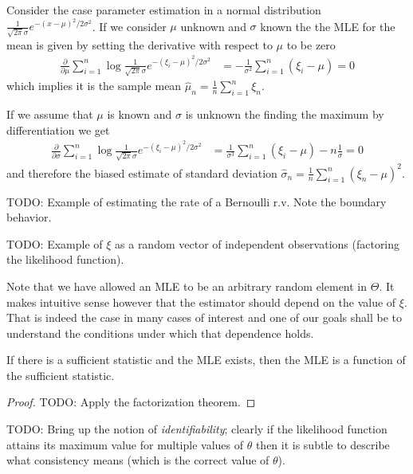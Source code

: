 \begin{examp}\label{MLENormalParameters}Consider the case parameter estimation in a normal
  distribution $\frac{1}{\sqrt{2\pi}\sigma} e^{-(x - \mu)^2 /
    2\sigma^2}$.  If we consider $\mu$ unknown and $\sigma$ known the
    the MLE for the mean is given by setting the derivative with
    respect to $\mu$ to be zero
\begin{align*}
\frac{\partial}{\partial \mu} \sum_{i=1}^n \log \frac{1}{\sqrt{2\pi}\sigma} e^{-(\xi_i - \mu)^2 /
    2\sigma^2} &= - \frac{1}{\sigma^2} \sum_{i=1}^n (\xi_i - \mu) = 0 
\end{align*}
which implies it is the sample mean $\hat{\mu}_n = \frac{1}{n}
\sum_{i=1}^n \xi_n$.

If we assume that $\mu$ is known and $\sigma$ is unknown the finding
the maximum by differentiation we get
\begin{align*}
\frac{\partial}{\partial \sigma} \sum_{i=1}^n \log \frac{1}{\sqrt{2\pi}\sigma} e^{-(\xi_i - \mu)^2 /
    2\sigma^2} &= \frac{1}{\sigma^3} \sum_{i=1}^n (\xi_i - \mu) - n \frac{1}{\sigma}= 0 
\end{align*}
and therefore the biased estimate of standard deviation $\hat{\sigma}_n = \frac{1}{n} \sum_{i=1}^n (\xi_n-\mu)^2$.
\end{examp}

TODO: Example of estimating the rate of a Bernoulli r.v.  Note the
boundary behavior.

TODO:  Example of $\xi$ as a random vector of independent observations
(factoring the likelihood function).

Note that we have allowed an MLE to be an arbitrary random element in
$\Theta$.  It makes intuitive sense however that the estimator should
depend on the value of $\xi$.  That is indeed the case in many cases
of interest and one of our goals shall be to understand the conditions
under which that dependence holds.

\begin{thm}If there is a sufficient statistic and the MLE exists, then
  the MLE is a function of the sufficient statistic.
\end{thm}
\begin{proof}
TODO: Apply the factorization theorem.
\end{proof}

TODO: Bring up the notion of \emph{identifiability}; clearly if the
likelihood function attains its maximum value for multiple values of
$\theta$ then it is subtle to describe what consistency means (which
is the correct value of $\theta$).

